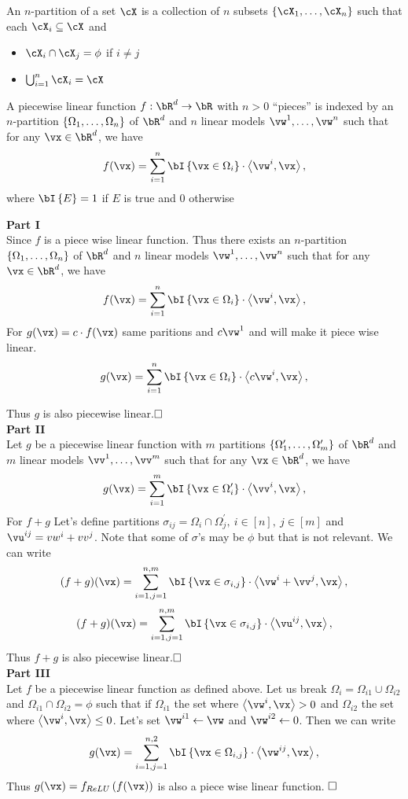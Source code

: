 \documentclass[a4paper,11pt]{article}
\begin{document}
\begin{mlsolution}
An $n$-partition of a set $\cX$ is a collection of $n$ subsets $\bc{\cX_1,\ldots,\cX_n}$ such that each $\cX_i \subseteq \cX$ and
\begin{itemize}
	\item $\cX_i \cap \cX_j = \phi$ if $i \neq j$
	\item $\bigcup_{i=1}^n \cX_i = \cX$
\end{itemize}
 A piecewise linear function $f: \bR^d \rightarrow \bR$ with $n > 0$ ``pieces'' is indexed by an $n$-partition $\left\{{\Omega_1,\ldots,\Omega_n}\right\}$ of $\bR^d$ and $n$ linear models $\vw^1,\ldots,\vw^n$ such that for any $\vx \in \bR^d$, we have
\[
f(\vx) = \sum_{i=1}^n \ind{\vx \in \Omega_i}\cdot\ip{\vw^i}{\vx},
\]
where $\ind{E} = 1$ if $E$ is true and $0$ otherwise

\textbf{Part I}\\
Since $f$ is a piece wise linear function. Thus there exists an $n$-partition $\left\{{\Omega_1,\ldots,\Omega_n}\right\}$ of $\bR^d$ and $n$ linear models $\vw^1,\ldots,\vw^n$ such that for any $\vx \in \bR^d$, we have
\[
f(\vx) = \sum_{i=1}^n \ind{\vx \in \Omega_i}\cdot\ip{\vw^i}{\vx},
\]
For $g(\vx)=c\cdot f(\vx)$ same paritions and $c\vw^1$ and will make it piece wise linear.
\[
g(\vx) = \sum_{i=1}^n \ind{\vx \in \Omega_i}\cdot\ip{c\vw^i}{\vx},
\]

Thus $g$ is also piecewise linear.$ \hfill \square $\\
\textbf{Part II}\\
Let $g$ be a piecewise linear function with $m$ partitions $\left\{{\Omega_1^\prime,\ldots,\Omega_{m}^\prime}\right\}$ of $\bR^d$  and $m$ linear models $\vv^1,\ldots,\vv^m$ such that for any $\vx \in \bR^d$, we have
\[
g(\vx) = \sum_{i=1}^m \ind{\vx \in \Omega_i^\prime}\cdot\ip{\vv^i}{\vx},
\]
For $f + g$ Let's define partitions $\sigma_{ij} = \Omega_i \cap \Omega_j^\prime, \ i \in [n] ,\ j \in [m] $ and $\vu^{ij} = vw^i + vv^j$. Note that some of $\sigma$'s may be $\phi$ but that is not relevant. We can write
\[
(f+g)(\vx) = \sum_{i=1,j=1}^{n,m} \ind{\vx \in \sigma_{i,j}}\cdot\ip{\vw^i + \vv^j}{\vx},
\]
\[
(f+g)(\vx) = \sum_{i=1,j=1}^{n,m} \ind{\vx \in \sigma_{i,j}}\cdot\ip{\vu^{ij}}{\vx},
\]
Thus $f+g$ is also piecewise linear.$ \hfill \square $\\
\textbf{Part III}\\
Let $f$ be a piecewise linear function as defined above.
Let us break $\Omega_i = \Omega_{i1} \cup \Omega_{i2}$ and $\Omega_{i1} \cap \Omega_{i2} = \phi$ such that
if $\Omega_{i1}$ the set where $\ip{\vw^i}{\vx} > 0$ and $\Omega_{i2}$ the set where $\ip{\vw^i}{\vx} \leq 0$.
Let's set $\vw^{i1} \gets \vw$ and $\vw^{i2} \gets 0$.
Then we can write
\[
g(\vx) = \sum_{i=1,j=1}^{n,2} \ind{\vx \in \Omega_{i,j}}\cdot\ip{\vw^{ij}}{\vx},
\]
Thus $g(\vx) = f_{ReLU}\left(f(\vx)\right)$ is also a piece wise linear function. $ \hfill \square $\\


\end{mlsolution}
\end{document}
